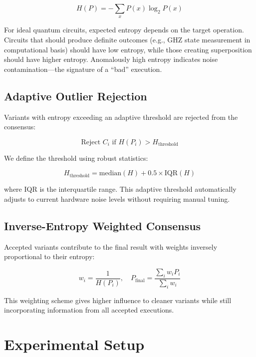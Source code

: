 \documentclass[twocolumn,preprintnumbers,amsmath,amssymb,prl]{revtex4-2}
\begin{document}
\begin{equation}
H(P) = -\sum_x P(x) \log_2 P(x)
\end{equation}

For ideal quantum circuits, expected entropy depends on the target operation. Circuits that should produce definite outcomes (e.g., GHZ state measurement in computational basis) should have low entropy, while those creating superposition should have higher entropy. Anomalously high entropy indicates noise contamination---the signature of a ``bad'' execution.

\subsection{Adaptive Outlier Rejection}

Variants with entropy exceeding an adaptive threshold are rejected from the consensus:

\begin{equation}
\text{Reject } C_i \text{ if } H(P_i) > H_{\text{threshold}}
\end{equation}

We define the threshold using robust statistics:

\begin{equation}
H_{\text{threshold}} = \text{median}(H) + 0.5 \times \text{IQR}(H)
\end{equation}

where IQR is the interquartile range. This adaptive threshold automatically adjusts to current hardware noise levels without requiring manual tuning.

\subsection{Inverse-Entropy Weighted Consensus}

Accepted variants contribute to the final result with weights inversely proportional to their entropy:

\begin{equation}
w_i = \frac{1}{H(P_i)}, \quad P_{\text{final}} = \frac{\sum_i w_i P_i}{\sum_i w_i}
\end{equation}

This weighting scheme gives higher influence to cleaner variants while still incorporating information from all accepted executions.

\section{Experimental Setup}
\end{document}
